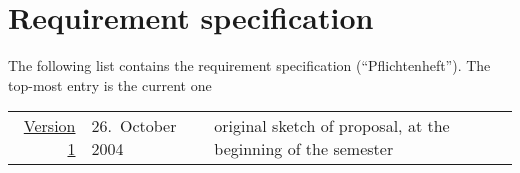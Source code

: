 
\section*{Requirement specification}
\label{sec:requirement specification}

The following list contains the requirement specification
(``Pflichtenheft'').  The top-most entry is the current one

\begin{center}
  \begin{tabular}[t]{r@{\quad}l@{\quad\quad}l@{\quad\quad}p{9cm}}
    \href{requirements/v1}{Version 1}
    &
    26.\ October 2004
    & 
    original sketch of proposal, at the beginning of the semester
  \end{tabular}
\end{center}





